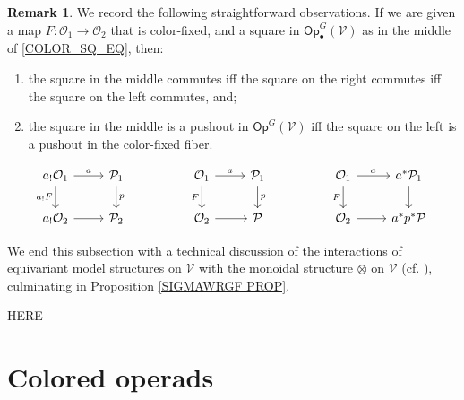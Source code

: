 \documentclass[a4paper,10pt
,draft
]{article}%
\numberwithin{equation}{section}
\numberwithin{figure}{section}
\theoremstyle{definition} %
\newtheorem{remark}[equation]{Remark}%
\newcommand{\Op}{\mathsf{Op}}%
\newcommand{\V}{\ensuremath{\mathcal V}}
\renewcommand{\O}{\ensuremath{\mathcal O}}
\renewcommand{\P}{\ensuremath{\mathcal P}}
\newcommand{\1}{\ensuremath{\mathbbm 1}}%
\begin{document}
\begin{remark}\label{COLOR_SQ_REM}
      We record the following straightforward observations.
      If we are given a map $F: \O_1 \to \O_2$ that is color-fixed,
      and a square in $\Op^G_\bullet(\V)$ as in the middle of \eqref{COLOR_SQ_EQ}, then:
      \begin{enumerate}[label = (\roman*)]
      \item the square in the middle commutes iff the square on the right commutes iff the square on the left commutes, and;
      \item the square in the middle is a pushout in $\Op^G(\V)$ iff
            the square on the left is a pushout in the color-fixed fiber. %
      \end{enumerate}
      \begin{equation}
            \label{COLOR_SQ_EQ}
            \begin{tikzcd}
                  a_! \O_1 \arrow[d, "a_! F"'] \arrow[r, "a"]
                  &
                  \P_1 \arrow[d, "p"]
                  &&
                  \O_1 \arrow[d, "F"'] \arrow[r, "a"]
                  &
                  \P_1 \arrow[d, "p"]
                  &&
                  \O_1 \arrow[d, "F"'] \arrow[r, "a"]
                  &
                  a^{\**} \P_1 \arrow[d]
                  \\
                  a_! \O_2 \arrow[r]
                  &
                  \P_2
                  &&
                  \O_2 \arrow[r]
                  &
                  \P
                  &&
                  \O_2 \arrow[r]
                  &
                  a^{\**} p^{\**} \P
            \end{tikzcd}
      \end{equation}
\end{remark}




We end this subsection with a technical discussion of the interactions of equivariant model structures on 
$\mathcal{V}$ with the monoidal structure $\otimes$ on $\mathcal{V}$ (cf. \cite[\S 6.2]{BP_geo}),
culminating in Proposition \ref{SIGMAWRGF PROP}.

{\color{red} HERE}



\section{Colored operads}
\end{document}
